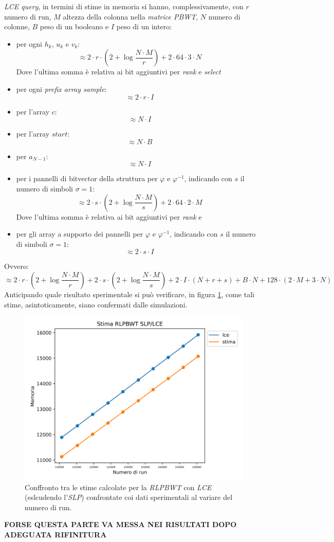  \textit{LCE query}, in termini di stime in memoria si
 hanno, complessivamente, con $r$ numero di run, $M$ altezza della colonna
 nella \textit{matrice PBWT}, $N$ numero di colonne, $B$ peso di un booleano e
 $I$ peso di un intero:  
\begin{itemize}
  \item per ogni $h_k$, $u_k$ e $v_k$:
  \[\approx 2\cdot r\cdot \left(2+\log\frac{N\cdot
        M}{r}\right) +2\cdot 64\cdot 3\cdot N\]
  Dove l'ultima somma è relativa ai bit aggiuntivi per \textit{rank} e
  \textit{select} 
  \item per ogni \textit{prefix array sample}:
  \[\approx 2\cdot r \cdot I\]
  \item per l'array $c$:
  \[\approx N\cdot I\]
  \item per l'array $start$:
  \[\approx N\cdot B\]
  \item per $a_{N-1}$:
  \[\approx N\cdot I\]
  \item per i pannelli di bitvector della struttura per $\varphi$ e
  $\varphi^{-1}$, 
  indicando con $s$ il numero di simboli $\sigma=1$:
  \[\approx 2\cdot s\cdot \left(2+\log\frac{N\cdot M}{s}\right) + 2\cdot
    64\cdot 2\cdot M\]
   Dove l'ultima somma è relativa ai bit aggiuntivi per \textit{rank} e
  \item per gli array a supporto dei pannelli per $\varphi$ e
  $\varphi^{-1}$, indicando con $s$ il numero di simboli $\sigma=1$:
  \[\approx 2\cdot s\cdot I\]
\end{itemize}
Ovvero:
\[\approx 2\cdot r\cdot \left(2+\log\frac{N\cdot M}{r}\right) +2\cdot s\cdot
  \left(2+\log\frac{N\cdot M}{s}\right)+2\cdot I\cdot (N+r+s)+B\cdot N+128\cdot
  (2\cdot M+3\cdot N)\]
Anticipando quale risultato sperimentale si può verificare, in figura
\ref{fig:runs}, come tali stime, asintoticamente, siano confermati dalle
simulazioni. 

\begin{figure}
  \centering
  \includegraphics[scale = 0.7]{img/runs.png}
  \caption{Conffronto tra le stime calcolate per la \textit{RLPBWT} con
    \textit{LCE} (eslcudendo l'\textit{SLP}) confrontate coi dati sperimentali
    al variare del numero di run.}
  \label{fig:runs}
\end{figure}
\textbf{FORSE QUESTA PARTE VA MESSA NEI RISULTATI DOPO ADEGUATA RIFINITURA}